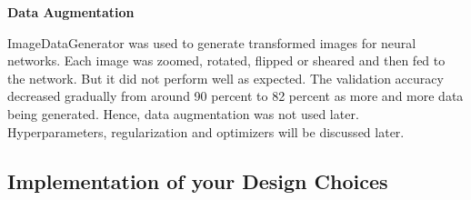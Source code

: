 \documentclass[12pt]{article}
\begin{document}
\textbf{Data Augmentation}

ImageDataGenerator was used to generate transformed images for neural networks. Each image was zoomed, rotated, flipped or sheared and then fed to the network. But it did not perform well as expected. The validation accuracy decreased gradually from around 90 percent to 82 percent as more and more data being generated. Hence, data augmentation was not used later.\\

Hyperparameters, regularization and optimizers will be discussed later.

\subsection{Implementation of your Design Choices}
\end{document}
